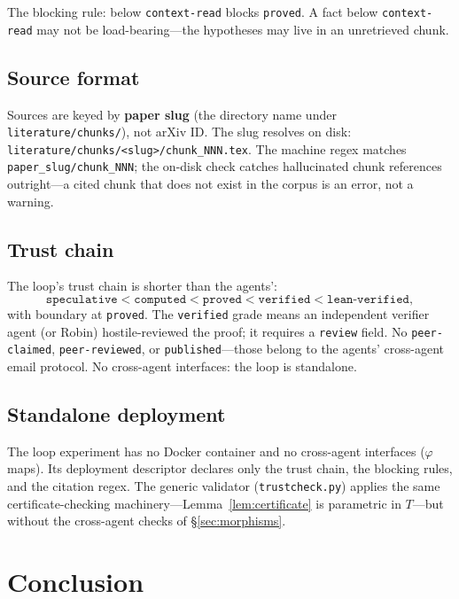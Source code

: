 \documentclass[11pt,a4paper]{article}
\newcommand{\level}[1]{\texttt{#1}}
\newcommand{\field}[1]{\texttt{#1}}
\theoremstyle{plain}
\theoremstyle{definition}
\begin{document}
The blocking rule: below \level{context-read} blocks \level{proved}. A
fact below \level{context-read} may not be load-bearing---the hypotheses
may live in an unretrieved chunk.

\subsection{Source format}

Sources are keyed by \textbf{paper slug} (the directory name under
\texttt{literature/chunks/}), not arXiv ID. The slug resolves on disk:
\texttt{literature/chunks/<slug>/chunk\_NNN.tex}. The machine regex
matches \texttt{paper\_slug/chunk\_NNN}; the on-disk check catches
hallucinated chunk references outright---a cited chunk that does not
exist in the corpus is an error, not a warning.

\subsection{Trust chain}

The loop's trust chain is shorter than the agents':
%
\[
\level{speculative} < \level{computed} < \level{proved} < \level{verified}
< \level{lean-verified},
\]
%
with boundary at \level{proved}. The \level{verified} grade means an
independent verifier agent (or Robin) hostile-reviewed the proof; it
requires a \field{review} field. No \level{peer-claimed},
\level{peer-reviewed}, or \level{published}---those belong to the
agents' cross-agent email protocol. No cross-agent interfaces: the
loop is standalone.

\subsection{Standalone deployment}

The loop experiment has no Docker container and no cross-agent
interfaces ($\varphi$ maps). Its deployment descriptor declares only
the trust chain, the blocking rules, and the citation regex. The
generic validator (\texttt{trustcheck.py}) applies the same
certificate-checking machinery---Lemma~\ref{lem:certificate} is
parametric in $T$---but without the cross-agent checks of
\S\ref{sec:morphisms}.

\section{Conclusion}
\label{sec:conclusion}
\end{document}
